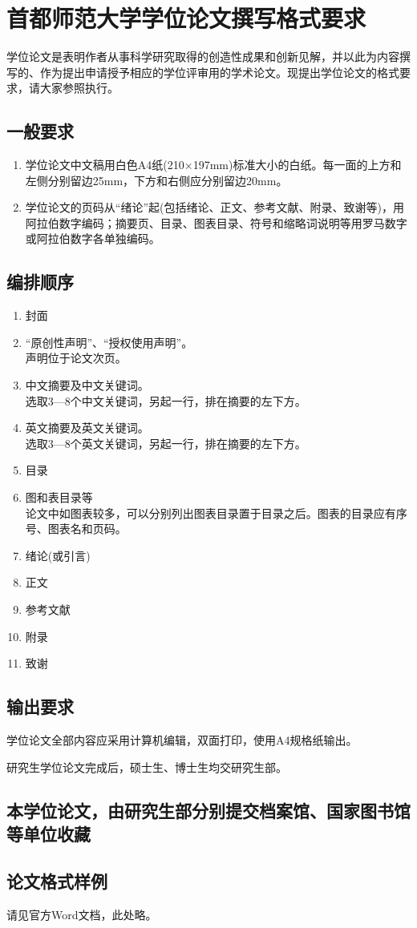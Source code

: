\chapter{首都师范大学学位论文撰写格式要求}
\label{cha:engorg}
学位论文是表明作者从事科学研究取得的创造性成果和创新见解，并以此为内容撰写的、作为提出申请授予相应的学位评审用的学术论文。现提出学位论文的格式要求，请大家参照执行。

\section{一般要求}
\begin{enumerate}
\item 学位论文中文稿用白色A4纸(210×197mm)标准大小的白纸。每一面的上方和左侧分别留边25mm，下方和右侧应分别留边20mm。

\item 学位论文的页码从“绪论”起(包括绪论、正文、参考文献、附录、致谢等)，用阿拉伯数字编码；摘要页、目录、图表目录、符号和缩略词说明等用罗马数字或阿拉伯数字各单独编码。
\end{enumerate}

\section{编排顺序}
\begin{enumerate}
\item 封面
\item “原创性声明”、“授权使用声明”。\\
声明位于论文次页。
\item 中文摘要及中文关键词。\\
选取3—8个中文关键词，另起一行，排在摘要的左下方。
\item 英文摘要及英文关键词。\\
选取3—8个英文关键词，另起一行，排在摘要的左下方。
\item 目录
\item 图和表目录等\\
论文中如图表较多，可以分别列出图表目录置于目录之后。图表的目录应有序号、图表名和页码。
\item 绪论(或引言)
\item 正文
\item 参考文献
\item 附录
\item 致谢
\end{enumerate}
\section{输出要求}

学位论文全部内容应采用计算机编辑，双面打印，使用A4规格纸输出。\par

研究生学位论文完成后，硕士生、博士生均交研究生部。

\section{本学位论文，由研究生部分别提交档案馆、国家图书馆等单位收藏}
\section{论文格式样例}
请见官方Word文档，此处略。

